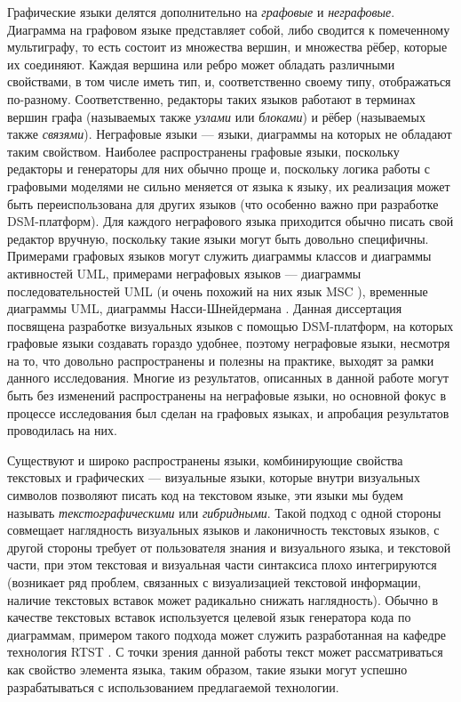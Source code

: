 Графические языки делятся дополнительно на \textit{графовые} и \textit{неграфовые}. Диаграмма на 
графовом языке представляет собой, либо сводится к помеченному мультиграфу, то 
есть состоит из множества вершин, и множества рёбер, которые их соединяют. 
Каждая вершина или ребро может обладать различными свойствами, в том числе иметь 
тип, и, соответственно своему типу, отображаться по-разному. Соответственно,
 редакторы таких языков работают в терминах вершин графа (называемых также 
\textit{узлами} или \textit{блоками}) и рёбер (называемых также \textit{связями}). Неграфовые языки --- 
языки, диаграммы на которых не обладают таким свойством. Наиболее распространены 
графовые языки, поскольку редакторы и генераторы для них обычно проще и, 
поскольку логика работы с графовыми моделями не сильно меняется от языка к 
языку, их реализация может быть переиспользована для других языков (что особенно 
важно при разработке DSM-платформ). Для каждого неграфового языка приходится 
обычно писать свой редактор вручную, поскольку такие языки могут быть довольно 
специфичны. Примерами графовых языков могут служить диаграммы классов и 
диаграммы активностей UML, примерами неграфовых языков --- диаграммы 
последовательностей UML (и очень похожий на них язык MSC
), временные диаграммы UML, диаграммы Насси-Шнейдермана
. Данная диссертация посвящена разработке визуальных языков с помощью 
DSM-платформ, на которых графовые языки создавать гораздо удобнее, поэтому 
неграфовые языки, несмотря на то, что довольно распространены и полезны на 
практике, выходят за рамки данного исследования. Многие из результатов, 
описанных в данной работе могут быть без изменений распространены на неграфовые 
языки, но основной фокус в процессе исследования был сделан на графовых языках, 
и апробация результатов проводилась на них.

Существуют и широко распространены языки, комбинирующие свойства текстовых и 
графических --- визуальные языки, которые внутри визуальных символов позволяют 
писать код на текстовом языке, эти языки мы будем называть \textit{текстографическими} или \textit{гибридными}. 
Такой подход с одной стороны совмещает наглядность визуальных языков и лаконичность текстовых языков, с другой стороны 
требует от пользователя знания и визуального языка, и текстовой части, при этом 
текстовая и визуальная части синтаксиса плохо интегрируются (возникает ряд 
проблем, связанных с визуализацией текстовой информации, наличие текстовых
вставок может радикально снижать наглядность). Обычно в качестве текстовых 
вставок используется целевой язык генератора кода по диаграммам, примером такого 
подхода может служить разработанная на кафедре технология RTST 
. С точки зрения данной работы текст может рассматриваться как свойство элемента 
языка, таким образом, такие языки могут успешно разрабатываться с использованием 
предлагаемой технологии.

